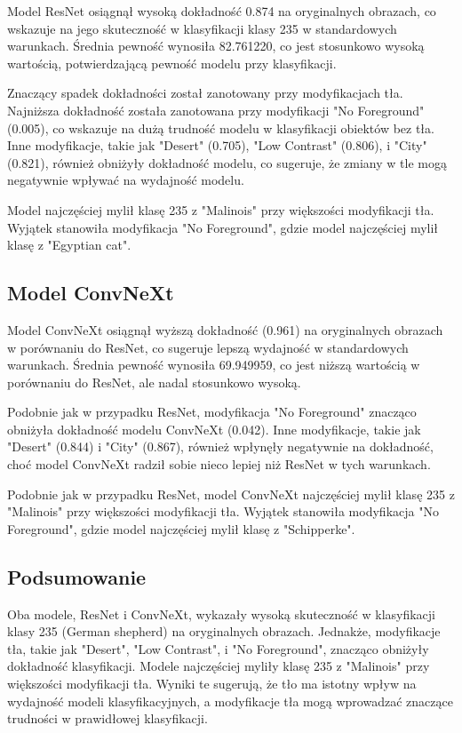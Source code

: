 Model ResNet osiągnął wysoką dokładność 0.874 na oryginalnych obrazach, co wskazuje na jego skuteczność w klasyfikacji klasy 235 w standardowych warunkach. Średnia pewność wynosiła 82.761220, co jest stosunkowo wysoką wartością, potwierdzającą pewność modelu przy klasyfikacji.

Znaczący spadek dokładności został zanotowany przy modyfikacjach tła. Najniższa dokładność została zanotowana przy modyfikacji "No Foreground" (0.005), co wskazuje na dużą trudność modelu w klasyfikacji obiektów bez tła. Inne modyfikacje, takie jak "Desert" (0.705), "Low Contrast" (0.806), i "City" (0.821), również obniżyły dokładność modelu, co sugeruje, że zmiany w tle mogą negatywnie wpływać na wydajność modelu.

Model najczęściej mylił klasę 235 z "Malinois" przy większości modyfikacji tła. Wyjątek stanowiła modyfikacja "No Foreground", gdzie model najczęściej mylił klasę z "Egyptian cat".

\subsection*{Model ConvNeXt}

Model ConvNeXt osiągnął wyższą dokładność (0.961) na oryginalnych obrazach w porównaniu do ResNet, co sugeruje lepszą wydajność w standardowych warunkach. Średnia pewność wynosiła 69.949959, co jest niższą wartością w porównaniu do ResNet, ale nadal stosunkowo wysoką.

Podobnie jak w przypadku ResNet, modyfikacja "No Foreground" znacząco obniżyła dokładność modelu ConvNeXt (0.042). Inne modyfikacje, takie jak "Desert" (0.844) i "City" (0.867), również wpłynęły negatywnie na dokładność, choć model ConvNeXt radził sobie nieco lepiej niż ResNet w tych warunkach.

Podobnie jak w przypadku ResNet, model ConvNeXt najczęściej mylił klasę 235 z "Malinois" przy większości modyfikacji tła. Wyjątek stanowiła modyfikacja "No Foreground", gdzie model najczęściej mylił klasę z "Schipperke".

\subsection*{Podsumowanie}

Oba modele, ResNet i ConvNeXt, wykazały wysoką skuteczność w klasyfikacji klasy 235 (German shepherd) na oryginalnych obrazach. Jednakże, modyfikacje tła, takie jak "Desert", "Low Contrast", i "No Foreground", znacząco obniżyły dokładność klasyfikacji. Modele najczęściej myliły klasę 235 z "Malinois" przy większości modyfikacji tła. Wyniki te sugerują, że tło ma istotny wpływ na wydajność modeli klasyfikacyjnych, a modyfikacje tła mogą wprowadzać znaczące trudności w prawidłowej klasyfikacji.


